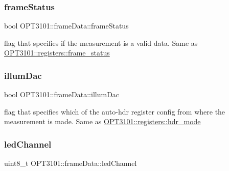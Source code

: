 \mbox{\label{class_o_p_t3101_1_1frame_data_ad291a49c4cfe78bb8de52749d9c0d318}} 
\subsubsection{\texorpdfstring{frame\+Status}{frameStatus}}
{\footnotesize\ttfamily bool O\+P\+T3101\+::frame\+Data\+::frame\+Status}



flag that specifies if the measurement is a valid data. Same as \mbox{\hyperlink{class_o_p_t3101_1_1registers_ab8c08b83252a06c3c59b4b33b4b1a8ba}{O\+P\+T3101\+::registers\+::frame\+\_\+status}} 

\mbox{\label{class_o_p_t3101_1_1frame_data_ada9279b0ee78ff855e95d1e34462cbaf}} 
\subsubsection{\texorpdfstring{illum\+Dac}{illumDac}}
{\footnotesize\ttfamily bool O\+P\+T3101\+::frame\+Data\+::illum\+Dac}



flag that specifies which of the auto-\/hdr register config from where the measurement is made. Same as \mbox{\hyperlink{class_o_p_t3101_1_1registers_a78e8bc6ad4a84c7d19974ba6c58e329e}{O\+P\+T3101\+::registers\+::hdr\+\_\+mode}} 

\mbox{\label{class_o_p_t3101_1_1frame_data_adac0d179c89ba3b8b10b0785c80d37fa}} 
\subsubsection{\texorpdfstring{led\+Channel}{ledChannel}}
{\footnotesize\ttfamily uint8\+\_\+t O\+P\+T3101\+::frame\+Data\+::led\+Channel}



